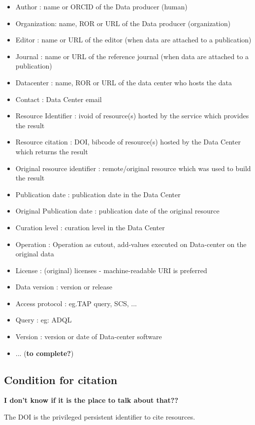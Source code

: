 \documentclass[11pt,a4paper]{ivoa}
\begin{document}
\begin{itemize}
\item Author : name or ORCID of the Data producer (human)
\item Organization:  name, ROR or URL of the Data producer (organization)
\item Editor : name or URL  of the editor (when data are attached to a publication)
\item Journal : name or URL of the reference journal (when data are attached to a publication)
\item Datacenter : name, ROR or URL of the data center who hosts the data 
\item Contact : Data Center email 
\item Resource Identifier : ivoid of resource(s) hosted by the service which provides the result
\item Resource citation : DOI, bibcode of resource(s) hosted by the Data Center which returns the result 
\item Original resource identifier : remote/original resource which was used to build the result
\item Publication date : publication date in the Data Center 
\item Original Publication date :  publication date of the original resource
\item Curation level : curation level in the Data Center
\item Operation : Operation as cutout, add-values executed on Data-center on the original data
\item License : (original) licenses - machine-readable URI is preferred
\item Data version : version or release
\item Access protocol :  eg.TAP query, SCS, ... 
\item Query : eg: ADQL 
\item Version : version or date of Data-center software
\item ... (\textbf{to complete?})
\end{itemize}


\subsection{Condition for citation}
\textbf{I don't know if it is the place to talk about that??}

The DOI is the privileged persistent identifier to cite resources.\\
\end{document}
